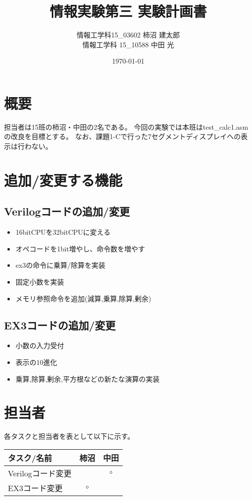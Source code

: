 \documentclass{jsarticle}
\title{情報実験第三 実験計画書}
\author{情報工学科15\_03602 柿沼 建太郎 \\ 情報工学科 15\_10588 中田 光}
\date{\today}
\begin{document}
\maketitle

\section*{概要}
担当者は15班の柿沼・中田の2名である。
今回の実験では本班はtest\_calc1.asmの改良を目標とする。
なお、課題1-Cで行った7セグメントディスプレイへの表示は行わない。

\section*{追加/変更する機能}
\subsection*{Verilogコードの追加/変更}
\begin{itemize}
    \item 16bitCPUを32bitCPUに変える
    \item オペコードを1bit増やし、命令数を増やす
    \item ex3の命令に乗算/除算を実装
    \item 固定小数を実装
    \item メモリ参照命令を追加(減算,乗算,除算,剰余)
\end{itemize}
\subsection*{EX3コードの追加/変更}
\begin{itemize}
    \item 小数の入力受付
    \item 表示の10進化
    \item 乗算,除算,剰余,平方根などの新たな演算の実装
\end{itemize}

\section*{担当者}
各タスクと担当者を表として以下に示す。
\begin{table}[h]
\begin{tabular}{|l|c|c|} \hline
タスク/名前 & 柿沼 & 中田 \\ \hline \hline
Verilogコード変更 &  & $\circ$ \\ \hline
EX3コード変更 & $\circ$ & \\ \hline
\end{tabular}
\end{table}
\end{document}
